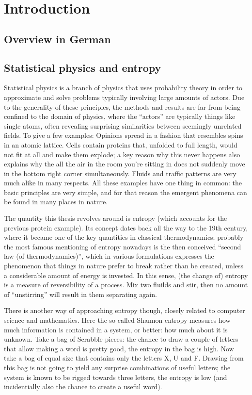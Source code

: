 \chapter{Introduction}


\section{Overview in German}




\section{Statistical physics and entropy}

Statistical physics is a branch of physics that uses probability theory in order to approximate and solve problems typically involving large amounts of actors. Due to the generality of these principles, the methods and results are far from being confined to the domain of physics, where the ``actors'' are typically things like single atoms, often revealing surprising similarities between seemingly unrelated fields. To give a few examples: Opinions spread in a fashion that resembles spins in an atomic lattice. Cells contain proteins that, unfolded to full length, would not fit at all and make them explode; a key reason why this never happens also explains why the all the air in the room you're sitting in does not suddenly move in the bottom right corner simultaneously. Fluids and traffic patterns are very much alike in many respects. All these examples have one thing in common: the basic principles are very simple, and for that reason the emergent phenomena can be found in many places in nature.

The quantity this thesis revolves around is entropy (which accounts for the previous protein example). Its concept dates back all the way to the 19th century, where it became one of the key quantities in classical thermodynamics; probably the most famous mentioning of entropy nowadays is the then conceived ``second law (of thermodynamics)'', which in various formulations expresses the phenomenon that things in nature prefer to break rather than be created, unless a considerable amount of energy is invested. In this sense, (the change of) entropy is a measure of reversibility of a process. Mix two fluilds and stir, then no amount of ``unstirring'' will result in them separating again.

There is another way of approaching entropy though, closely related to computer science and mathematics. Here the so-called Shannon entropy measures how much information is contained in a system, or better: how much about it is unknown. Take a bag of Scrabble pieces: the chance to draw a couple of letters that allow making a word is pretty good, the entropy in the bag is high. Now take a bag of equal size that contains only the letters X, U and F. Drawing from this bag is not going to yield any surprise combinations of useful letters; the system is known to be rigged towards three letters, the entropy is low (and incidentially also the chance to create a useful word).

